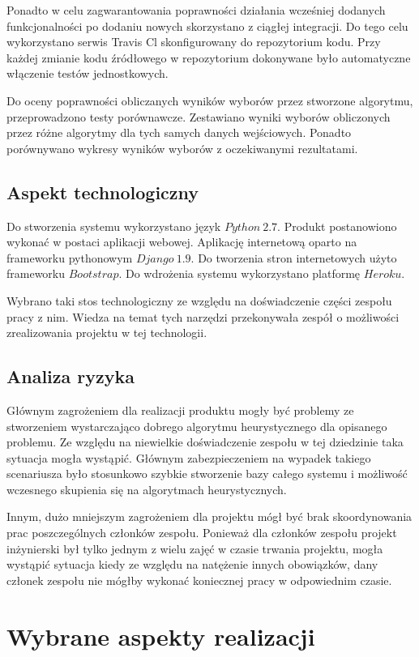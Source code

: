 \documentclass[polish,11pt]{aghthesis}
\begin{document}
Ponadto w celu zagwarantowania poprawności działania wcześniej dodanych
funkcjonalności po dodaniu nowych skorzystano z ciągłej integracji. Do tego celu
wykorzystano serwis Travis Cl skonfigurowany do repozytorium kodu. Przy każdej zmianie
kodu źródłowego w repozytorium dokonywane było automatyczne włączenie testów
jednostkowych.  

Do oceny poprawności obliczanych wyników wyborów przez stworzone algorytmu,
przeprowadzono testy porównawcze. Zestawiano wyniki wyborów obliczonych przez różne
algorytmy dla tych samych danych wejściowych. Ponadto porównywano wykresy wyników
wyborów z oczekiwanymi rezultatami.
\clearpage

\subsection{Aspekt technologiczny}
Do stworzenia systemu wykorzystano język $Python \ 2.7$. Produkt postanowiono wykonać w
postaci aplikacji webowej. Aplikację internetową oparto na frameworku pythonowym $Django \
1.9$. Do tworzenia stron internetowych użyto frameworku $Bootstrap$. Do wdrożenia systemu
wykorzystano platformę $Heroku$.

Wybrano taki stos technologiczny ze względu na doświadczenie części zespołu pracy z nim.
Wiedza na temat tych narzędzi przekonywała zespół o możliwości zrealizowania projektu w
tej technologii.

\subsection{Analiza ryzyka}
Głównym zagrożeniem dla realizacji produktu mogły być problemy ze stworzeniem
wystarczająco dobrego algorytmu heurystycznego dla opisanego problemu. Ze względu na
niewielkie doświadczenie zespołu w tej dziedzinie taka sytuacja mogła wystąpić. Głównym
zabezpieczeniem na wypadek takiego scenariusza było stosunkowo szybkie stworzenie
bazy całego systemu i możliwość wczesnego skupienia się na algorytmach heurystycznych.

Innym, dużo mniejszym zagrożeniem dla projektu mógł być brak skoordynowania prac
poszczególnych członków zespołu. Ponieważ dla członków zespołu projekt inżynierski był
tylko jednym z wielu zajęć w czasie trwania projektu, mogła wystąpić sytuacja kiedy ze
względu na natężenie innych obowiązków, dany członek zespołu nie mógłby wykonać
koniecznej pracy w odpowiednim czasie.

\section{Wybrane aspekty realizacji}
\end{document}
